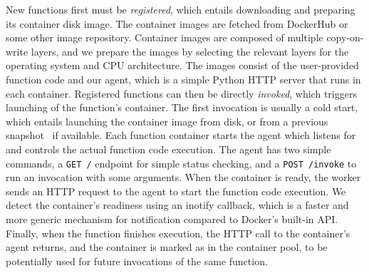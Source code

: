 New functions first must be \emph{registered}, which entails downloading and preparing its container disk image.
The container images are fetched from DockerHub or some other image repository.
Container images are composed of multiple copy-on-write layers, and we prepare the images by selecting the relevant layers for the operating system and CPU architecture.
The images consist of the user-provided function code and our agent, which is a simple Python HTTP server that runs in each container. 
%
Registered functions can then be directly \emph{invoked}, which triggers launching of the function's container.
The first invocation is usually a cold start, which entails launching the container image from disk, or from a previous snapshot~\cite{ustiugov2021benchmarking, ao2022faasnap} if available. 
Each function container starts the agent which listens for and controls the actual function code execution. 
The agent has two simple commands, a \texttt{GET /} endpoint for simple status checking, and a \texttt{POST /invoke} to run an invocation with some arguments.
When the container is ready, the worker sends an HTTP request to the agent to start the function code execution. 
We detect the container's readiness using an inotify callback, which is a faster and more generic mechanism for notification compared to Docker's built-in API. 
%
Finally, when the function finishes execution, the HTTP call to the container's agent returns, and the container is marked as  in the container pool, to be potentially used for future invocations of the same function.

